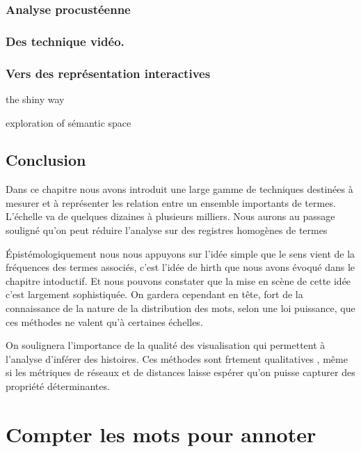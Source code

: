 \documentclass[
  letterpaper,
  DIV=11,
  numbers=noendperiod]{scrreprt}
\begin{document}
\subsection{Analyse procustéenne}\label{analyse-procustuxe9enne}

\subsection{Des technique vidéo.}\label{des-technique-viduxe9o.}

\subsection{Vers des représentation
interactives}\label{vers-des-repruxe9sentation-interactives}

the shiny way

exploration of sémantic space

\section{Conclusion}\label{conclusion-7}

Dans ce chapitre nous avons introduit une large gamme de techniques
destinées à mesurer et à représenter les relation entre un ensemble
importants de termes. L'échelle va de quelques dizaines à plusieurs
milliers. Nous aurons au passage souligné qu'on peut réduire l'analyse
sur des registres homogènes de termes

Épistémologiquement nous nous appuyons sur l'idée simple que le sens
vient de la fréquences des termes associés, c'est l'idée de hirth que
nous avons évoqué dans le chapitre intoductif. Et nous pouvons constater
que la mise en scène de cette idée c'est largement sophistiquée. On
gardera cependant en tête, fort de la connaissance de la nature de la
distribution des mots, selon une loi puissance, que ces méthodes ne
valent qu'à certaines échelles.

On soulignera l'importance de la qualité des visualisation qui
permettent à l'analyse d'inférer des histoires. Ces méthodes sont
frtement qualitatives , même si les métriques de réseaux et de distances
laisse espérer qu'on puisse capturer des propriété déterminantes.


\chapter{Compter les mots pour
annoter}\label{compter-les-mots-pour-annoter}
\end{document}
